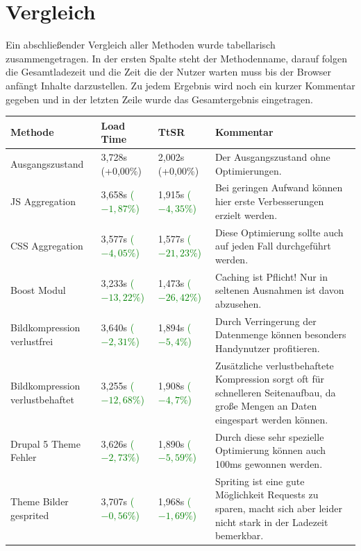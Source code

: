 \section{Vergleich}
Ein abschlie\ss{}ender Vergleich aller Methoden wurde tabellarisch zusammengetragen. In der ersten Spalte steht der Methodenname, darauf folgen die Gesamtladezeit und die Zeit die der Nutzer warten muss bis der Browser anf\"angt Inhalte darzustellen. Zu jedem Ergebnis wird noch ein kurzer Kommentar gegeben und in der letzten Zeile wurde das Gesamtergebnis eingetragen.
\begin{center}
    \begin{longtable}{ | p{3cm} | p{1.5cm} | p{1.5cm} | p{6cm} |}
    \hline
    Methode & Load Time & TtSR & Kommentar \\ \hline
    \hline
    Ausgangszustand 			& 3,728s (+0,00\%)  				& 2,002s (+0,00\%) & Der Ausgangszustand ohne Optimierungen. \\ \hline
    JS Aggregation 			& 3,658s \textcolor{green}{($-1,87\%$)}  	& 1,915s \textcolor{green}{($-4,35\%$)} & Bei geringen Aufwand können hier erste Verbesserungen erzielt werden. \\ \hline
    CSS Aggregation 			& 3,577s \textcolor{green}{($-4,05\%$)} 	& 1,577s \textcolor{green}{($-21,23\%$)}& Diese Optimierung sollte auch auf jeden Fall durchgeführt werden. \\ \hline
    Boost Modul 			& 3,233s \textcolor{green}{($-13,22\%$)} 	& 1,473s \textcolor{green}{($-26,42\%$)}& Caching ist Pflicht! Nur in seltenen Ausnahmen ist davon abzusehen. \\ \hline
    Bildkompression verlustfrei 	& 3,640s \textcolor{green}{($-2,31\%$)} 	& 1,894s \textcolor{green}{($-5,4\%$)}& Durch Verringerung der Datenmenge können besonders Handynutzer profitieren.  \\ \hline
    Bildkompression verlustbehaftet 	& 3,255s \textcolor{green}{($-12,68\%$)} 	& 1,908s \textcolor{green}{($-4,7\%$)}& Zusätzliche verlustbehaftete Kompression sorgt oft für schnelleren Seitenaufbau, da große Mengen an Daten eingespart werden können.  \\ \hline
    Drupal 5 Theme Fehler 		& 3,626s \textcolor{green}{($-2,73\%$)} 	& 1,890s \textcolor{green}{($-5,59\%$)}& Durch diese sehr spezielle Optimierung können auch 100ms gewonnen werden.  \\ \hline
    Theme Bilder gesprited 		& 3,707s \textcolor{green}{($-0,56\%$)} 	& 1,968s \textcolor{green}{($-1,69\%$)}& Spriting ist eine gute Möglichkeit Requests zu sparen, macht sich aber leider nicht stark in der Ladezeit bemerkbar.  \\ \hline

\end{longtable}
\end{center}
